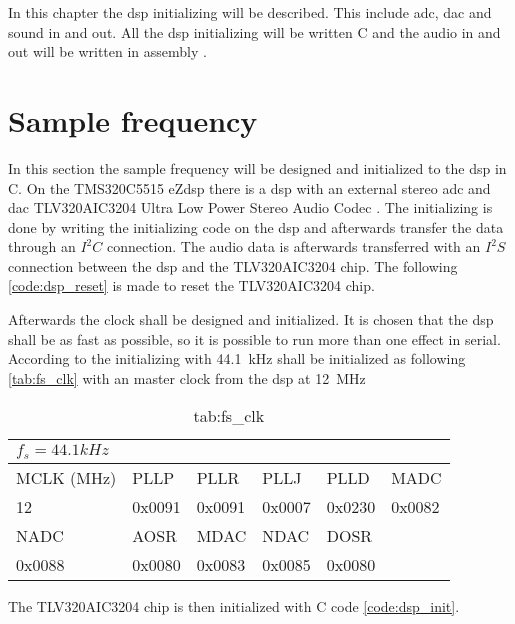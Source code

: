 \label{ch:disinit}
In this chapter the \gls{dsp} initializing will be described. This include \gls{adc}, \gls{dac} and sound in and out. All the \gls{dsp} initializing will be written C and the audio in and out will be written in assembly \citep{slaa557}. 

\section{Sample frequency}
In this section the sample frequency will be designed and initialized to the \gls{dsp} in C. 
On the TMS320C5515 eZdsp there is a \gls{dsp} with an external stereo \gls{adc} and \gls{dac} TLV320AIC3204 Ultra Low Power Stereo Audio Codec \citep{TLV320AIC3204}. The initializing is done by writing the initializing code on the \gls{dsp} and afterwards transfer the data through an $I^2C$ connection. The audio data is afterwards transferred with an $I^2S$ connection between the \gls{dsp} and the TLV320AIC3204 chip.
The following \autoref{code:dsp_reset} is made to reset the TLV320AIC3204 chip.


Afterwards the clock shall be designed and initialized. It is chosen that the \gls{dsp} shall be as fast as possible, so it is possible to run more than one effect in serial. According to \citep{slaa557} the initializing with \SI{44.1}{\kilo\hertz} shall be initialized as following \autoref{tab:fs_clk} with an master clock from the dsp at \SI{12}{\mega\hertz}

\begin{table}[]
\centering
\caption{tab:fs_clk}
\label{tab:fs_clk}
\begin{tabular}{|l|l|l|l|l|l|}
\hline
\multicolumn{6}{|l|}{$f_s=44.1kHz$}           \\ \hline
MCLK (MHz) & PLLP & PLLR & PLLJ & PLLD & MADC \\ \hline
12         & 0x0091    & 0x0091    & 0x0007    & 0x0230  & 0x0082    \\ \hline
NADC       & AOSR & MDAC & NDAC & DOSR &      \\ \hline
0x0088          & 0x0080  & 0x0083    & 0x0085    & 0x0080  &      \\ \hline
\end{tabular}
\end{table}


The TLV320AIC3204 chip is then initialized with C code  \autoref{code:dsp_init}.

